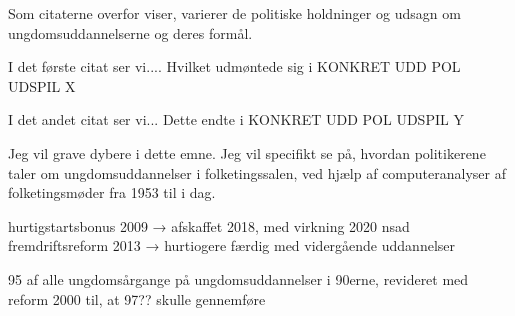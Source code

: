 Som citaterne overfor viser, varierer de politiske holdninger og udsagn om ungdomsuddannelserne og deres formål.

I det første citat ser vi....
Hvilket udmøntede sig i KONKRET UDD POL UDSPIL X

I det andet citat ser vi...
Dette endte i KONKRET UDD POL UDSPIL Y

Jeg vil grave dybere i dette emne.
Jeg vil specifikt se på, hvordan politikerene taler om ungdomsuddannelser i folketingssalen, ved hjælp af computeranalyser af folketingsmøder fra 1953 til i dag.

hurtigstartsbonus 2009 → afskaffet 2018, med virkning 2020
nsad
fremdriftsreform 2013 → hurtiogere færdig med vidergående uddannelser


95 \perc af alle ungdomsårgange på ungdomsuddannelser i 90erne, revideret med reform 2000 til, at 97?? skulle gennemføre
